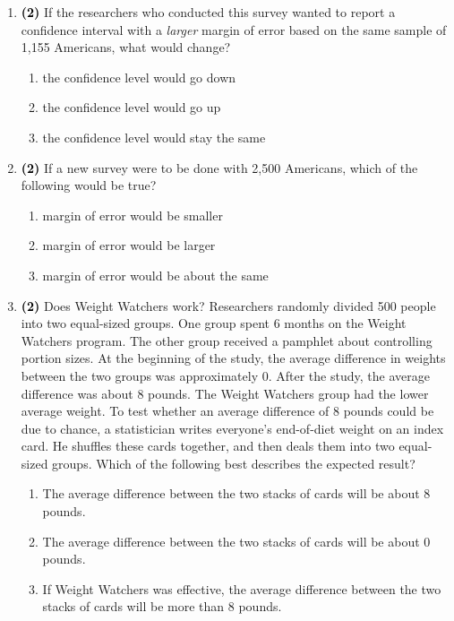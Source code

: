 \documentclass[11pt]{article}
\newcommand{\solnMult}[1]{ #1 }	%
\newcommand{\pts}[1]{ \textbf{{\footnotesize \textcolor{black}{(#1)}}} }	%
\begin{document}
\begin{enumerate}
%

\item \pts{2} If the researchers who conducted this survey wanted to report a confidence interval with a \emph{larger} margin of error based on the same sample of 1,155 Americans, what would change?
\begin{enumerate}
\item the confidence level would go down
\item \solnMult{the confidence level would go up}
\item the confidence level would stay the same \\
\end{enumerate}

%

\item \pts{2} \label{relaxL} If a new survey were to be done with 2,500 Americans, which of the following would be true?
\begin{enumerate}
\item \solnMult{margin of error would be smaller}
\item margin of error would be larger
\item margin of error would be about the same
\end{enumerate}

%

\pagebreak

\item \pts{2} Does Weight Watchers work? Researchers randomly divided 500 people into two equal-sized groups. One group spent 6 months on the Weight Watchers program. The other group received a pamphlet about controlling portion sizes. At the beginning of the study, the average difference in weights between the two groups was approximately 0. After the study, the average difference was about 8 pounds. The Weight Watchers group had the lower average weight. To test whether an average difference of 8 pounds could be due to chance, a statistician writes everyone's end-of-diet weight on an index card. He shuffles these cards together, and then deals them into two equal-sized groups. Which of the following best describes the expected result?

\begin{enumerate}
\item The average difference between the two stacks of cards will be about 8 pounds.
\item \solnMult{The average difference between the two stacks of cards will be about 0 pounds.}
\item If Weight Watchers was effective, the average difference between the two stacks of cards will be more than 8 pounds. \\
\end{enumerate}


\end{enumerate}
\end{document}

